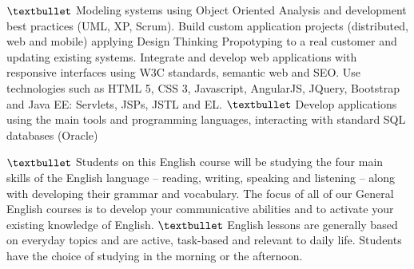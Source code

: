 \documentclass[
	a4paper,
]{fortysecondscv}
\begin{document}
\newpage
\makebacksidebar

\begin{cvtable}[1.8]
    {$\textbullet$ Modeling systems using Object Oriented Analysis and development best practices (UML, XP, Scrum).
    Build custom application projects (distributed, web and mobile) applying Design Thinking  Propotyping to a real customer and updating existing systems. Integrate and develop web applications with responsive interfaces using W3C standards, semantic web and SEO. Use technologies such as HTML 5, CSS 3, Javascript, AngularJS, JQuery, Bootstrap and Java EE: Servlets, JSPs, JSTL and EL.
    $\textbullet$ Develop applications using the main tools and programming languages, interacting with standard SQL databases (Oracle)}

    {$\textbullet$ Students on this English course will be studying the four main skills of the English language – reading, writing, speaking and listening – along with developing their grammar and vocabulary. The focus of all of our General English courses is to develop your communicative abilities and to activate your existing knowledge of English.
    $\textbullet$ English lessons are generally based on everyday topics and are active, task-based and relevant to daily life. Students have the choice of studying in the morning or the afternoon.}
\end{cvtable}
\end{document}
